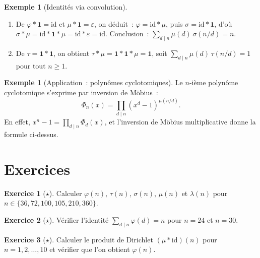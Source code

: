 \documentclass[12pt,a4paper,openany]{book}
\theoremstyle{definition}
\newtheorem{exemple}[definition]{Exemple}
\newtheorem{exercice}{Exercice}[chapter]
\theoremstyle{plain}
\theoremstyle{remark}
\begin{document}
\begin{exemple}[Identités via convolution]
\label{ex:identites-convolution}
\begin{enumerate}[label=(\alph*)]
  \item De $\varphi * \mathbf{1} = \mathrm{id}$ et $\mu * \mathbf{1} = \varepsilon$, on
    déduit~:
    $\varphi = \mathrm{id} * \mu$, puis $\sigma = \mathrm{id} * \mathbf{1}$, d'où
    $\sigma * \mu = \mathrm{id} * \mathbf{1} * \mu = \mathrm{id} * \varepsilon
    = \mathrm{id}$.
    Conclusion~: $\sum_{d \mid n} \mu(d)\,\sigma(n/d) = n$.
  \item De $\tau = \mathbf{1} * \mathbf{1}$, on obtient
    $\tau * \mu = \mathbf{1} * \mathbf{1} * \mu = \mathbf{1}$, soit
    $\sum_{d \mid n} \mu(d)\,\tau(n/d) = 1$ pour tout $n \geq 1$.
\end{enumerate}
\end{exemple}

\begin{exemple}[Application~: polynômes cyclotomiques]
\label{ex:cyclotomiques}
Le $n$-ième polynôme cyclotomique s'exprime par inversion de Möbius~:
\[
  \Phi_n(x) = \prod_{d \mid n} (x^d - 1)^{\mu(n/d)}.
\]
En effet, $x^n - 1 = \prod_{d \mid n} \Phi_d(x)$, et l'inversion de Möbius
multiplicative donne la formule ci-dessus.
\end{exemple}

\section{Exercices}
\label{sec:exos-ch8}

\begin{exercice}[$\star$]
\label{exo:calcul-fonctions}
Calculer $\varphi(n)$, $\tau(n)$, $\sigma(n)$, $\mu(n)$ et $\lambda(n)$ pour
$n \in \{36, 72, 100, 105, 210, 360\}$.
\end{exercice}

\begin{exercice}[$\star$]
\label{exo:verification-gauss}
Vérifier l'identité $\sum_{d \mid n} \varphi(d) = n$ pour $n = 24$ et $n = 30$.
\end{exercice}

\begin{exercice}[$\star$]
\label{exo:convolution-calcul}
Calculer le produit de Dirichlet $(\mu * \mathrm{id})(n)$ pour $n = 1, 2, \ldots, 10$
et vérifier que l'on obtient $\varphi(n)$.
\end{exercice}
\end{document}
